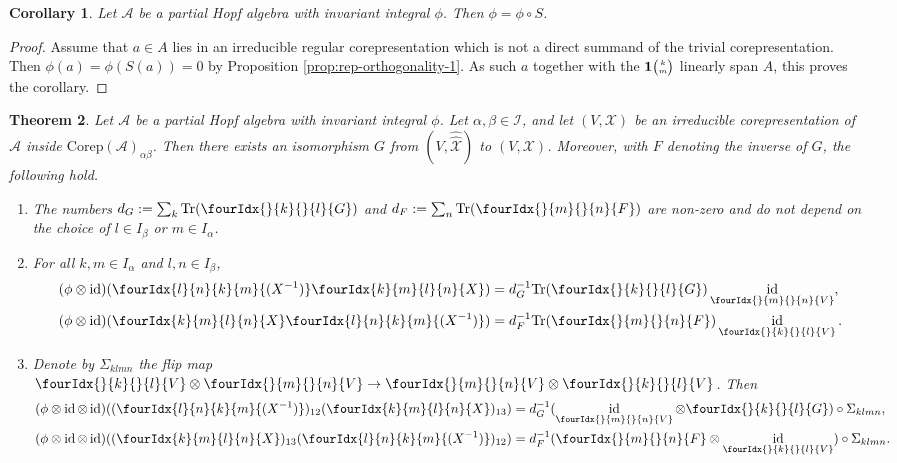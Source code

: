 \documentclass[10pt]{article}
\DeclareMathOperator{\id}{id}
\newcommand{\Corep}{\mathrm{Corep}}
\newcommand{\Tr}{\mathrm{Tr}}
\newcommand{\Grt}[3]{#1{\tiny {\begin{pmatrix} #2\\#3\end{pmatrix}}}}
\newcommand{\UnitC}[2]{\Grt{\mathbf{1}}{#1}{#2}}
\newcommand{\Gr}[5]{\fourIdx{#2}{#4}{#3}{#5}{#1}}%
\newcommand{\Gru}[3]{\Gr{#1}{}{}{#2}{#3}}
\newtheorem{Theorem}{Theorem}[section]
\newtheorem{Cor}[Theorem]{Corollary}
\theoremstyle{definition}
\numberwithin{equation}{section}
\begin{document}

\begin{Cor}\label{CorIntAnt} Let $\mathscr{A}$ be a partial Hopf algebra with invariant integral $\phi$. Then $\phi = \phi \circ S$.
\end{Cor} 

\begin{proof} Assume that $a \in A$ lies in an irreducible regular corepresentation which is not a direct summand of the trivial corepresentation. Then $\phi(a) = \phi(S(a)) = 0$ by Proposition \ref{prop:rep-orthogonality-1}. As such $a$ together with the $\UnitC{k}{m}$ linearly span $A$, this proves the corollary.
\end{proof}

\begin{Theorem} \label{thm:rep-orthogonality} Let $\mathscr{A}$ be a partial Hopf algebra with invariant integral $\phi$. Let $\alpha,\beta\in \mathscr{I}$, and let $(V,\mathscr{X})$
  be an irreducible corepresentation of $\mathscr{A}$ inside $\Corep(\mathscr{A})_{\alpha\beta}$. Then there exists an isomorphism 
 $G$ from $(V,\hat{\hat{\mathscr{X}}})$ to $(V,\mathscr{X})$.
  Moreover, with $F$ denoting the inverse of $G$, the following hold.
  \begin{enumerate}[label=(\arabic*)]
  \item The numbers $d_G:=\sum_{k} \Tr (\Gru{G}{k}{l})$ and $d_F:=\sum_{n} \Tr (\Gru{F}{m}{n})$ are non-zero and do not depend on the choice of $l \in I_\beta$ or $m\in I_\alpha$.
    \item  For all $k,m \in I_\alpha$ and $l,n\in I_\beta$,
    \begin{align*}
      (\phi \otimes \id)(\Gr{(X^{-1})}{l}{k}{n}{m}\Gr{X}{k}{l}{m}{n})
      &=d_G^{-1}\Tr(\Gru{G}{k}{l})
      \id_{\Gru{V}{m}{n}}, \\
      (\phi \otimes \id)(\Gr{X}{k}{l}{m}{n}\Gr{(X^{-1})}{l}{k}{n}{m})
      &=d_F^{-1}\Tr(\Gru{F}{m}{n})
      \id_{\Gru{V}{k}{l}}.
    \end{align*}
  \item Denote by $\Sigma_{klmn}$ the flip map $\Gru{V}{k}{l}
    \otimes \Gru{V}{m}{n} \to \Gru{V}{m}{n}
    \otimes \Gru{V}{k}{l}$. Then
 \begin{align*}
   (\phi \otimes \id \otimes
   \id)((\Gr{(X^{-1})}{l}{k}{n}{m})_{12}(\Gr{X}{k}{l}{m}{n})_{13}) &=
   d_G^{-1}
   (\id_{\Gru{V}{m}{n}} \otimes \Gru{G}{k}{l})
   \circ \Sigma_{klmn}, \\
   (\phi \otimes \id \otimes
   \id)((\Gr{X}{k}{l}{m}{n})_{13}(\Gr{(X^{-1})}{l}{k}{n}{m})_{12}) &= d_F^{-1} (\Gru{F}{m}{n}
   \otimes \id_{\Gru{V}{k}{l}}) \circ \Sigma_{klmn}.
 \end{align*}
\end{enumerate}
  \end{Theorem}
\end{document}
